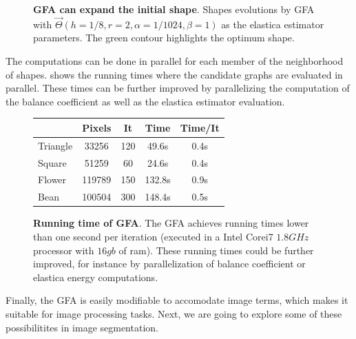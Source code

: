 \documentclass{siamart220329}
\begin{document}
\begin{figure}
\caption{\textbf{GFA can expand the initial shape}. Shapes evolutions by GFA
with $\vec{\Theta}(h=1/8,r=2,\alpha=1/1024, \beta=1)$ as the elastica
estimator parameters. The green contour highlights the optimum shape.}
\label{fig:graph-flow-expand}
\end{figure}
%
%
The computations can be done in parallel for each member of the neighborhood of
shapes.  shows the running times where
the candidate graphs are evaluated in parallel. These times can be further
improved by parallelizing the computation of the balance coefficient as well as
the elastica estimator evaluation.
%
%
\begin{figure}[h!]
\center
\captionsetup{type=table}
\footnotesize
\caption{\textbf{Running time of GFA}. The GFA achieves running times lower than
one second per iteration (executed in a Intel Corei7 $1.8GHz$ processor with
$16gb$ of ram). These running times could be further improved, for instance
by parallelization of balance coefficient  or elastica energy
computations.}\label{tab:summary-graph-flow-running-time} 
\begin{tabular}{|l|c|c|c|c|}
\hline
& Pixels & It & Time & Time/It\\
\hline
Triangle & 33256 & 120 & 49.6s & 0.4s \\
Square & 51259 & 60 & 24.6s & 0.4s \\
Flower & 119789 & 150 & 132.8s & 0.9s \\
Bean & 100504 & 300 & 148.4s & 0.5s \\
\hline
\end{tabular}
\end{figure}
%
%
Finally, the GFA is easily modifiable to accomodate image terms, which makes it
suitable for image processing tasks. Next, we are going to explore some of these
possibilitites in image segmentation.
%
%
\end{document}
